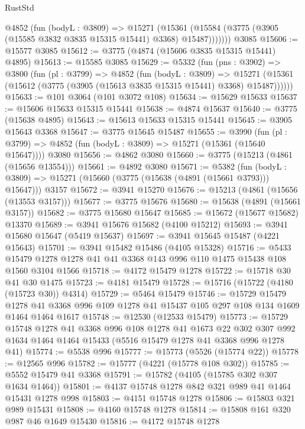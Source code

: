 \begin{lexlean}{RustStd}
\begin{coremodule}
{\begin{coremodule}
{{{{{{{{{{{{{{{{{{{{{{{{{{{{{{{        @4852
          (fun (bodyL : @3809) =>
          @15271
            (@15361 (@15584 (@3775 (@3905 (@15585 @3832 @3835 @15315 @15441) @3368) @15487)))))))
    @3085
@15606 := @15577 @3085
@15612 := @3775 (@4874 (@15606 @3835 @15315 @15441) @4895)
@15613 := @15585 @3085
@15629 := @5332
    (fun (pns : @3902) =>
    @3800
      (fun (pl : @3799) =>
      @4852
        (fun (bodyL : @3809) =>
        @15271 (@15361 (@15612 (@3775 (@3905 (@15613 @3835 @15315 @15441) @3368) @15487))))))
@15633 := @101 @3064 (@101 @3072 @108)
@15634 := @15629 @15633
@15637 := @15606 @15633 @15315 @15441
@15638 := @4874 @15637
@15640 := @3775 (@15638 @4895)
@15643 := @15613 @15633 @15315 @15441
@15645 := @3905 @15643 @3368
@15647 := @3775 @15645 @15487
@15655 := @3990
    (fun (pl : @3799) => @4852 (fun (bodyL : @3809) => @15271 (@15361 (@15640 @15647))))
    @3080
@15656 := @4862 @3080
@15660 := @3775 (@15213 (@4861 (@15656 @13554)))
@15661 := @4892 @3080
@15671 := @5382
    (fun (bodyL : @3809) => @15271 (@15660 (@3775 (@15638 (@4891 (@15661 @3793))) @15647)))
    @3157
@15672 := @3941 @15270
@15676 := @15213 (@4861 (@15656 (@13553 @3157)))
@15677 := @3775 @15676
@15680 := @15638 (@4891 (@15661 @3157))
@15682 := @3775 @15680 @15647
@15685 := @15672 (@15677 @15682) @13370
@15689 := @3941 @15676 @15682 (@4100 @15212)
@15693 := @3941 @15680 @15647 (@5419 @15637)
@15697 := @3941 @15645 @15487 (@4221 @15643)
@15701 := @3941 @15482 @15486 (@4105 @15328)
@15716 := @5433 @15479 @1278 @1278 @41 @41 @3368 @143 @996 @110 @1475 @15438 @108 @1560 @3104 @1566
@15718 := @4172 @15479 @1278
@15722 := @15718 @30 @41 @30 @1475
@15723 := @4181 @15479
@15728 := @15716 (@15722 (@4180 (@15723 @30)) @4314)
@15729 := @5464 @15479
@15746 := @15729
    @15479
    @1278
    @41
    @3368
    @996
    @109
    @1278
    @41
    @15437
    @105
    @297
    @108
    @134
    @1609
    @1464
    @1464
    @1617
@15748 := @12530 (@12533 @15479)
@15773 := @15729
    @15748
    @1278
    @41
    @3368
    @996
    @108
    @1278
    @41
    @1673
    @22
    @302
    @307
    @992
    @1634
    @1464
    @1464
    @15433
    (@5516 @15479 @1278 @41 @3368 @996 @1278 @41)
@15774 := @5538 @996
@15777 := @15773 (@5526 (@15774 @22))
@15778 := @12565 @996
@15782 := @15777 (@4221 (@15778 @108 @302))
@15785 := @5552 @15479 @41 @3368
@15791 := @15782 (@4105 (@15785 @302 @307 @1634 @1464))
@15801 := @4137 @15748 @1278 @842 @321 @989 @41 @1464 @15431 @1278 @998
@15803 := @4151 @15748 @1278
@15806 := @15803 @321 @989 @15431
@15808 := @4160 @15748 @1278
@15814 := @15808 @161 @320 @987 @46 @1649 @15430
@15816 := @4172 @15748 @1278
}}}}}}}}}}}}}}}}}}}}}}}}}}}}}}}
\end{coremodule}}
\end{coremodule}
\end{lexlean}
